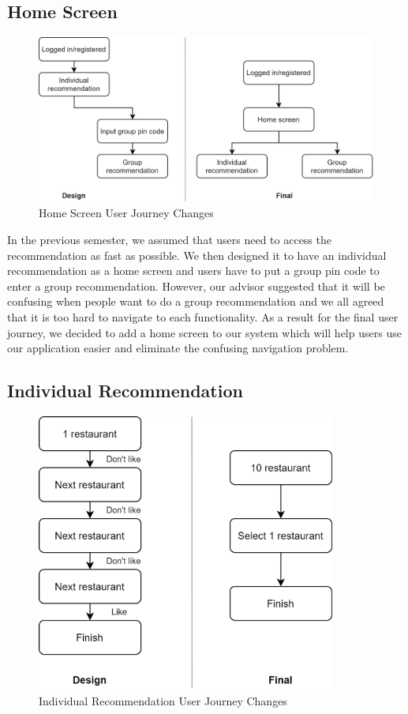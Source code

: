 \documentclass[12pt,oneside,openright,a4paper]{cpe-english-project}
\begin{document}
\subsection{Home Screen}

\begin{figure}[H]\centering
\includegraphics[width=350pt]{./images/4HomeScreenUserJourneyChanges.png}
\caption{Home Screen User Journey Changes}\label{fig:4HomeScreenUserJourneyChanges}
\end{figure}\vspace{-24pt}

In the previous semester, we assumed that users need to access the recommendation as fast as possible. We then designed it to have an individual recommendation as a home screen and users have to put a group pin code to enter a group recommendation. However, our advisor suggested that it will be confusing when people want to do a group recommendation and we all agreed that it is too hard to navigate to each functionality. As a result for the final user journey, we decided to add a home screen to our system which will help users use our application easier and eliminate the confusing navigation problem.

\subsection{Individual Recommendation}

\begin{figure}[H]\centering
\includegraphics[width=280pt]{./images/4IndividualRecommendationUserJourneyChanges.png}
\caption{Individual Recommendation User Journey Changes}\label{fig:4IndividualRecommendationUserJourneyChanges}
\end{figure}\vspace{-24pt}
\end{document}
